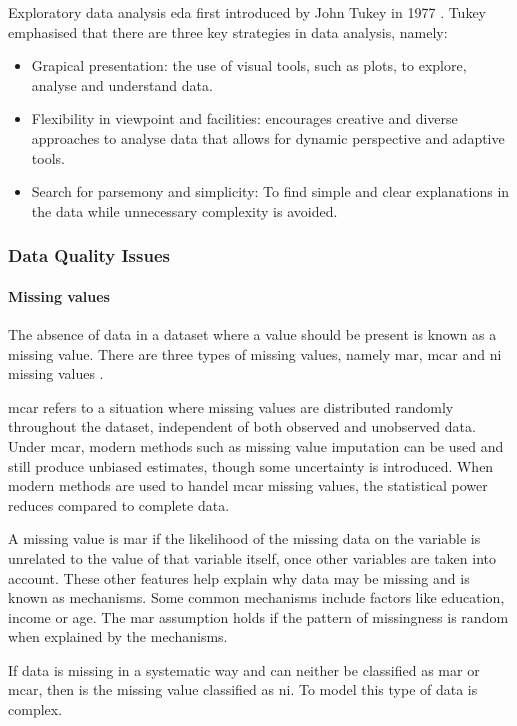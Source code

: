 \documentclass[10pt, conference]{IEEEtran}
\begin{document}
Exploratory data analysis \acrshort{eda} first introduced by John Tukey in 1977 \cite{EDA_ref}. Tukey
emphasised that there are three key strategies in data analysis, namely:
\begin{itemize}
    \item Grapical presentation: the use of visual tools, such as plots, to explore, analyse and understand data.
    \item Flexibility in viewpoint and facilities: encourages creative and diverse approaches to analyse data
          that allows for dynamic perspective and adaptive tools.
    \item Search for parsemony and simplicity: To find simple and clear explanations in the data while
          unnecessary complexity is avoided.
\end{itemize}

\subsubsection{Data Quality Issues}

\paragraph{Missing values}

The absence of data in a dataset where a value should be present is known as a missing value. There are
three types of missing values, namely \acrfull{mar}, \acrfull{mcar} and \acrfull{ni} missing values \cite{Missing_ref}.

\acrshort{mcar} refers to a situation where missing values are distributed randomly throughout the dataset, independent
of both observed and unobserved data. Under \acrshort{mcar}, modern methods such as missing value imputation can be
used and still produce unbiased estimates, though some uncertainty is introduced. When modern methods are used
to handel \acrshort{mcar} missing values, the statistical power reduces compared to complete data.

A missing value is \acrshort{mar} if the likelihood of the missing data on the variable is unrelated to the value of
that variable itself, once other variables are taken into account. These other features help explain why data may
be missing and is known as mechanisms. Some common mechanisms include factors like education, income or age.
The \acrshort{mar} assumption holds if the pattern of missingness is random when explained by the mechanisms.

If data is missing in a systematic way and can neither be classified as \acrshort{mar} or \acrshort{mcar}, then
is the missing value classified as \acrshort{ni}. To model this type of data is complex.
\end{document}
